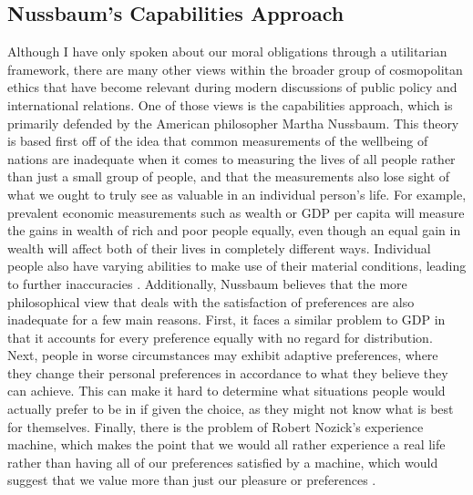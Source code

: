 \documentclass[12pt]{article}
\begin{document}
\subsection*{Nussbaum's Capabilities Approach}
Although I have only spoken about our moral obligations through a utilitarian framework, there are many other views within the broader group of cosmopolitan ethics that have become relevant during modern discussions of public policy and international relations.
One of those views is the capabilities approach, which is primarily defended by the American philosopher Martha Nussbaum.
This theory is based first off of the idea that common measurements of the wellbeing of nations are inadequate when it comes to measuring the lives of all people rather than just a small group of people, and that the measurements also lose sight of what we ought to truly see as valuable in an individual person's life.
For example, prevalent economic measurements such as wealth or GDP per capita will measure the gains in wealth of rich and poor people equally, even though an equal gain in wealth will affect both of their lives in completely different ways.
Individual people also have varying abilities to make use of their material conditions, leading to further inaccuracies \autocite[238]{nussbaum2019}.
Additionally, Nussbaum believes that the more philosophical view that deals with the satisfaction of preferences are also inadequate for a few main reasons.
First, it faces a similar problem to GDP in that it accounts for every preference equally with no regard for distribution.
Next, people in worse circumstances may exhibit adaptive preferences, where they change their personal preferences in accordance to what they believe they can achieve.
This can make it hard to determine what situations people would actually prefer to be in if given the choice, as they might not know what is best for themselves.
Finally, there is the problem of Robert Nozick's experience machine, which makes the point that we would all rather experience a real life rather than having all of our preferences satisfied by a machine, which would suggest that we value more than just our pleasure or preferences \autocite[239]{nussbaum2019}.
\end{document}
